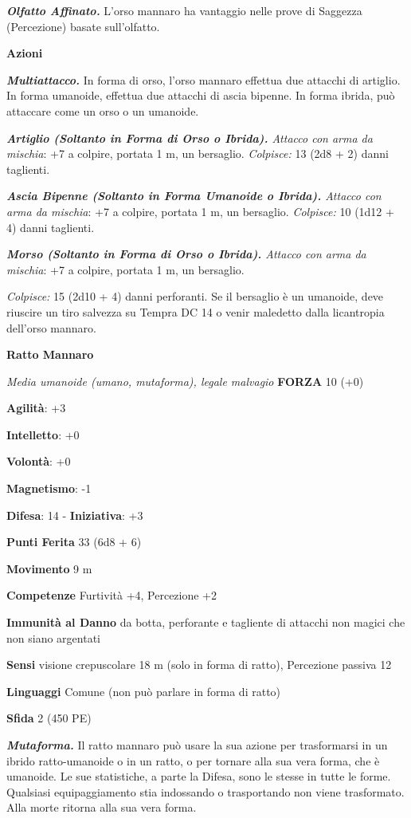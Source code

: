 \begin{multicols}{2}
\emph{\textbf{Olfatto Affinato.}} L'orso mannaro ha vantaggio nelle
prove di Saggezza (Percezione) basate sull'olfatto.

\smallskip\textbf{Azioni}

\emph{\textbf{Multiattacco.}} In forma di orso, l'orso mannaro effettua
due attacchi di artiglio. In forma umanoide, effettua due attacchi di
ascia bipenne. In forma ibrida, può attaccare come un orso o un
umanoide.

\emph{\textbf{Artiglio (Soltanto in Forma di Orso o Ibrida).} Attacco
con arma da mischia}: +7 a colpire, portata 1 m, un bersaglio.
\emph{Colpisce:} 13 (2d8 + 2) danni taglienti.

\emph{\textbf{Ascia Bipenne (Soltanto in Forma Umanoide o Ibrida).}
Attacco con arma da mischia}: +7 a colpire, portata 1 m, un bersaglio.
\emph{Colpisce:} 10 (1d12 + 4) danni taglienti.

\emph{\textbf{Morso (Soltanto in Forma di Orso o Ibrida).} Attacco con
arma da mischia}: +7 a colpire, portata 1 m, un bersaglio.

\emph{Colpisce:} 15 (2d10 + 4) danni perforanti. Se il bersaglio è un
umanoide, deve riuscire un tiro salvezza su Tempra DC 14 o venir
maledetto dalla licantropia dell'orso mannaro.

\textbf{Ratto Mannaro}

\emph{Media umanoide (umano, mutaforma), legale malvagio} \textbf{FORZA}
10 (+0)

\textbf{Agilità}: +3

\textbf{Intelletto}: +0

\textbf{Volontà}: +0

\textbf{Magnetismo}: -1

\textbf{Difesa}: 14 - \textbf{Iniziativa}: +3

\textbf{Punti Ferita} 33 (6d8 + 6)

\textbf{Movimento} 9 m

\textbf{Competenze} Furtività +4, Percezione +2

\textbf{Immunità al Danno} da botta, perforante e tagliente di
attacchi non magici che non siano argentati

\textbf{Sensi} visione crepuscolare 18 m (solo in forma di ratto), Percezione
passiva 12

\textbf{Linguaggi} Comune (non può parlare in forma di ratto)

\textbf{Sfida} 2 (450 PE)\smallskip

\emph{\textbf{Mutaforma.}} Il ratto mannaro può usare la sua azione per
trasformarsi in un ibrido ratto-umanoide o in un ratto, o per tornare
alla sua vera forma, che è umanoide. Le sue statistiche, a parte la Difesa,
sono le stesse in tutte le forme. Qualsiasi equipaggiamento stia
indossando o trasportando non viene trasformato. Alla morte ritorna alla
sua vera forma.


\end{multicols}
